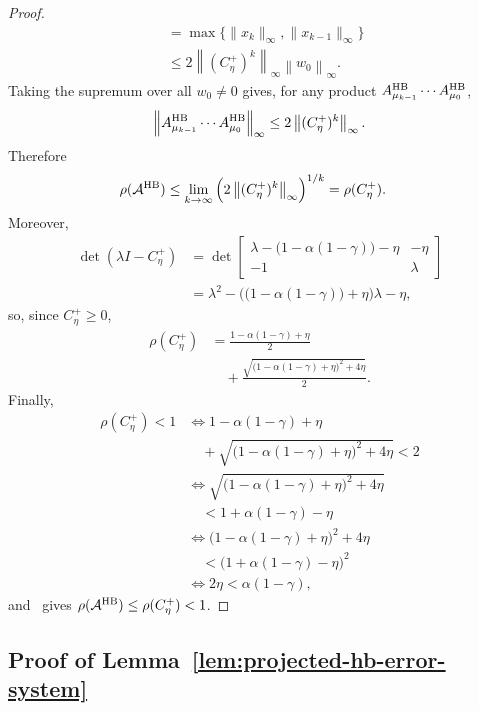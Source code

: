 \documentclass[letterpaper]{article}
\numberwithin{equation}{section}
\begin{document}
\begin{proof}
\begin{align*}
  &=\max\{\|x_k\|_\infty,\|x_{k-1}\|_\infty\}\\
  &\le
  2\left\|(C_\eta^+)^k\right\|_\infty
  \left\|w_0\right\|_\infty.
\end{align*}
Taking the supremum over all $w_0\ne0$ gives, for any product
$A_{\mu_{k-1}}^{\rm HB}\cdots A_{\mu_0}^{\rm HB}$,
\begin{align*}
  \left\|A_{\mu_{k-1}}^{\rm HB}\cdots A_{\mu_0}^{\rm HB}\right\|_\infty
  \le
  2\left\|(C_\eta^+)^k\right\|_\infty.
\end{align*}
Therefore
\begin{align*}
  \rho(\mathcal A^{\rm HB})
  &\le
  \lim_{k\to\infty}
  \left(2\left\|(C_\eta^+)^k\right\|_\infty\right)^{1/k}
  =\rho(C_\eta^+).
\end{align*}
Moreover,
\begin{align*}
  \det(\lambda I-C_\eta^+)
  &=
  \det\begin{bmatrix}
    \lambda-\bigl(1-\alpha(1-\gamma)\bigr)-\eta&-\eta\\
    -1&\lambda
  \end{bmatrix}\\
  &=\lambda^2-\bigl(\bigl(1-\alpha(1-\gamma)\bigr)+\eta\bigr)\lambda-
  \eta,
\end{align*}
so, since $C_\eta^+\ge0$,
\begin{align*}
\rho(C_\eta^+)
  &=\frac{1-\alpha(1-\gamma)+\eta}{2}\\
  &\quad+
  \frac{\sqrt{\bigl(1-\alpha(1-\gamma)+\eta\bigr)^2+4\eta}}{2}.
\end{align*}
Finally,
\begin{align*}
\rho(C_\eta^+)<1
  &\Longleftrightarrow
  1-\alpha(1-\gamma)+\eta\\
  &\quad+
  \sqrt{\bigl(1-\alpha(1-\gamma)+\eta\bigr)^2+4\eta}<2\\
  &\Longleftrightarrow
  \sqrt{\bigl(1-\alpha(1-\gamma)+\eta\bigr)^2+4\eta}\\
  &\quad<1+\alpha(1-\gamma)-\eta\\
  &\Longleftrightarrow
  \bigl(1-\alpha(1-\gamma)+\eta\bigr)^2+4\eta\\
  &\quad<\bigl(1+\alpha(1-\gamma)-\eta\bigr)^2\\
  &\Longleftrightarrow 2\eta<\alpha(1-\gamma),
\end{align*}
and~ gives
$\rho(\mathcal A^{\rm HB})\le\rho(C_\eta^+)<1$.
\end{proof}

\subsection{Proof of Lemma~\ref{lem:projected-hb-error-system}}
\label{app:proof-lem-projected-hb-error-system}
\end{document}
